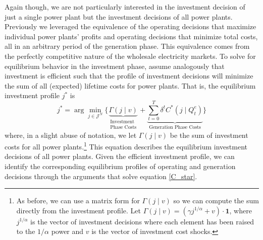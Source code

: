 Again though, we are not particularly interested in the investment decision of just a single power plant but the investment decisions of all power plants. Previously we leveraged the equivalence of the operating decisions that maximize individual power plants' profits and operating decisions that minimize total costs, all in an arbitrary period of the generation phase. This equivalence comes from the perfectly competitive nature of the wholesale electricity markets. To solve for equilibrium behavior in the investment phase, assume analogously that investment is efficient such that the profile of investment decisions will minimize the sum of all (expected) lifetime costs for power plants. That is, the equilibrium investment profile $j^*$ is
\begin{equation}
    j^* = \arg\min_{j \in \mathcal{J}^N} \biggl\{ 
    \underbrace{\Gamma (j \mid v)}_{\substack{\text{Investment}\\ \text{Phase Costs}}} + \underbrace{\sum_{t=0}^T \delta^t C^*(j\mid Q_t^e)}_{\text{Generation Phase Costs}}  \biggr\}
\end{equation}
where, in a slight abuse of notation, we let $\Gamma (j\mid v)$ be the sum of investment costs for all power plants.\footnote{
    As before, we can use a matrix form for $\Gamma (j\mid v)$ so we can compute the sum directly from the investment profile. Let $\Gamma(j\mid v) = \left(\gamma j^{1/\alpha} + v\right)\cdot \textbf{1}$, where $j^{1/\alpha}$ is the vector of investment decisions where each element has been raised to the $1/\alpha$ power and $v$ is the vector of investment cost shocks.
} This equation describes the equilibrium investment decisions of all power plants. Given the efficient investment profile, we can identify the corresponding equilibrium profiles of operating and generation decisions through the arguments that solve equation \eqref{C_star}.





